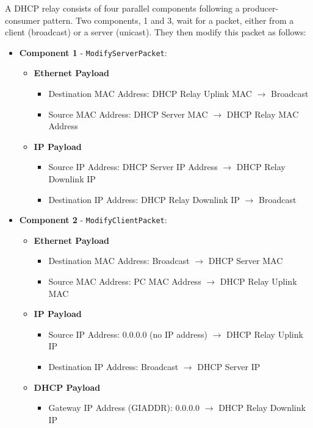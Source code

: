A DHCP relay consists of four parallel components following a producer-consumer pattern. Two components, 1 and 3, wait for a packet, either from a client (broadcast) or a server (unicast). They then modify this packet as follows:
\begin{itemize}
	\item \textbf{Component 1} - \texttt{ModifyServerPacket}:
	\begin{itemize}
		\item \textbf{Ethernet Payload}
		\begin{itemize}
			\item Destination MAC Address: DHCP Relay Uplink MAC $\to$ Broadcast
			\item Source MAC Address: DHCP Server MAC $\to$ DHCP Relay MAC Address
		\end{itemize} 
			\item \textbf{IP Payload}
		\begin{itemize}
			\item Source IP Address: DHCP Server IP Address $\to$ DHCP Relay Downlink IP
			\item Destination IP Address: DHCP Relay Downlink IP $\to$ Broadcast
		\end{itemize}	
	\end{itemize}
	\item \textbf{Component 2} - \texttt{ModifyClientPacket}:
	\begin{itemize}
		\item \textbf{Ethernet Payload}
		\begin{itemize}
			\item Destination MAC Address: Broadcast $\to$ DHCP Server MAC
			\item Source MAC Address: PC MAC Address $\to$ DHCP Relay Uplink MAC 
		\end{itemize}
		\item \textbf{IP Payload}
		\begin{itemize}
			\item Source IP Address: 0.0.0.0 (no IP address) $\to$ DHCP Relay Uplink IP
			\item Destination IP Address: Broadcast $\to$ DHCP Server IP
		\end{itemize}
		\item \textbf{DHCP Payload}
		\begin{itemize}
			\item Gateway IP Address (GIADDR): 0.0.0.0 $\to$ DHCP Relay Downlink IP
		\end{itemize}
	\end{itemize}
\end{itemize}

